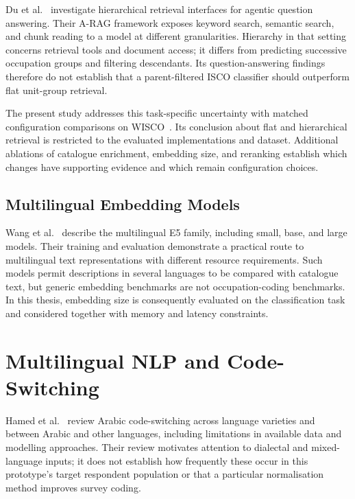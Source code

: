 Du et al.~\cite{arag2026hierarchical} investigate hierarchical retrieval
interfaces for agentic question answering. Their A-RAG framework exposes
keyword search, semantic search, and chunk reading to a model at different
granularities. Hierarchy in that setting concerns retrieval tools and
document access; it differs from predicting successive occupation groups
and filtering descendants. Its question-answering findings therefore do
not establish that a parent-filtered ISCO classifier should outperform
flat unit-group retrieval.

The present study addresses this task-specific uncertainty with matched
configuration comparisons on WISCO~\cite{wisco2023}. Its conclusion about
flat and hierarchical retrieval is restricted to the evaluated
implementations and dataset. Additional ablations of catalogue
enrichment, embedding size, and reranking establish which changes have
supporting evidence and which remain configuration choices.

\subsection{Multilingual Embedding Models}

Wang et al.~\cite{wang2024multilinguale5} describe the multilingual E5
family, including small, base, and large models. Their training and
evaluation demonstrate a practical route to multilingual text
representations with different resource requirements. Such models
permit descriptions in several languages to be compared with catalogue
text, but generic embedding benchmarks are not occupation-coding
benchmarks. In this thesis, embedding size is consequently evaluated on
the classification task and considered together with memory and latency
constraints.

\section{Multilingual NLP and Code-Switching}
\label{sec:rw-multilingual}

Hamed et al.~\cite{hamed2025codeswitching} review Arabic code-switching
across language varieties and between Arabic and other languages,
including limitations in available data and modelling approaches. Their
review motivates attention to dialectal and mixed-language inputs;
it does not establish how frequently these occur in this prototype's
target respondent population or that a particular normalisation method
improves survey coding.

